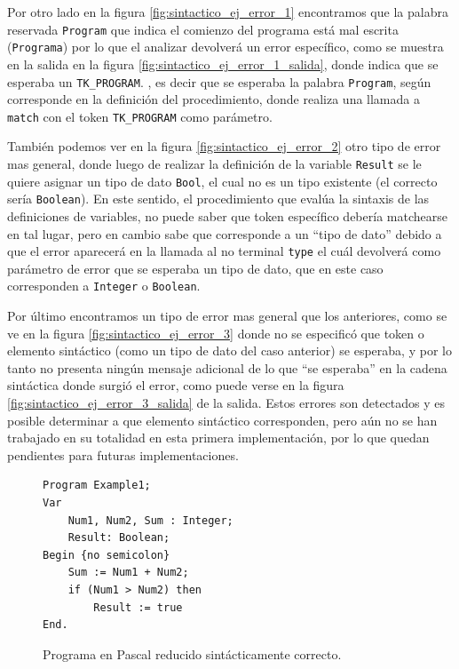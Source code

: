 Por otro lado en la figura \ref{fig:sintactico_ej_error_1} encontramos que la palabra reservada \texttt{Program} que indica el comienzo del programa está mal escrita (\texttt{Programa}) por lo que el analizar devolverá un error específico, como se muestra en la salida en la figura \ref{fig:sintactico_ej_error_1_salida}, donde indica que se esperaba un \texttt{TK\_PROGRAM}. , es decir que se esperaba la palabra \texttt{Program}, según corresponde en la definición del procedimiento, donde realiza una llamada a \texttt{match} con el token \texttt{TK\_PROGRAM} como parámetro.

También podemos ver en la figura \ref{fig:sintactico_ej_error_2} otro tipo de error mas general, donde luego de realizar la definición de la variable \texttt{Result} se le quiere asignar un tipo de dato \texttt{Bool}, el cual no es un tipo existente (el correcto sería \texttt{Boolean}). En este sentido, el procedimiento que evalúa la sintaxis de las definiciones de variables, no puede saber que token específico debería matchearse en tal lugar, pero en cambio sabe que corresponde a un ``tipo de dato'' debido a que el error aparecerá en la llamada al no terminal \texttt{type} el cuál devolverá como parámetro de error que se esperaba un tipo de dato, que en este caso corresponden a \texttt{Integer} o \texttt{Boolean}.

Por último encontramos un tipo de error mas general que los anteriores, como se ve en la figura \ref{fig:sintactico_ej_error_3} donde no se especificó que token o elemento sintáctico (como un tipo de dato del caso anterior) se esperaba, y por lo tanto no presenta ningún mensaje adicional de lo que ``se esperaba'' en la cadena sintáctica donde surgió el error, como puede verse en la figura \ref{fig:sintactico_ej_error_3_salida} de la salida. Estos errores son detectados y es posible determinar a que elemento sintáctico corresponden, pero aún no se han trabajado en su totalidad en esta primera implementación, por lo que quedan pendientes para futuras implementaciones.

\begin{figure}[H]
\begin{verbatim}
Program Example1;
Var       
    Num1, Num2, Sum : Integer;
    Result: Boolean;
Begin {no semicolon}
    Sum := Num1 + Num2;
    if (Num1 > Num2) then
        Result := true
End.
\end{verbatim}
\caption{Programa en Pascal reducido sintácticamente correcto.}
\label{fig:sintactico_ej_correcto}
\end{figure}

